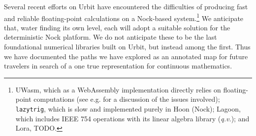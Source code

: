 \documentclass[twoside]{article}
\begin{document}
Several recent efforts on Urbit have encountered the difficulties of producing fast and reliable floating-point calculations on a Nock-based system.\footnote{UWasm, which as a WebAssembly implementation directly relies on floating-point computations \citep{UWasm} (see e.g. \citet{KloudKoder2022} for a discussion of the issues involved); \texttt{lazytrig}, which is slow and implemented purely in Hoon (Nock); Lagoon, which includes IEEE 754 operations with its linear algebra library (\emph{q.v.}); and Lora, TODO.}  We anticipate that, water finding its own level, each will adopt a suitable solution for the deterministic Nock platform.  We do not anticipate these to be the last foundational numerical libraries built on Urbit, but instead among the first.  Thus we have documented the paths we have explored as an annotated map for future travelers in search of a one true representation for continuous mathematics.



\end{document}
